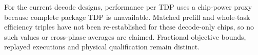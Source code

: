 For the current decode designs, performance per TDP uses a chip-power proxy because complete package TDP is unavailable.
Matched prefill and whole-task efficiency triples have not been re-established for these decode-only chips, so no such values or cross-phase averages are claimed.
Fractional objective bounds, replayed executions and physical qualification remain distinct.

